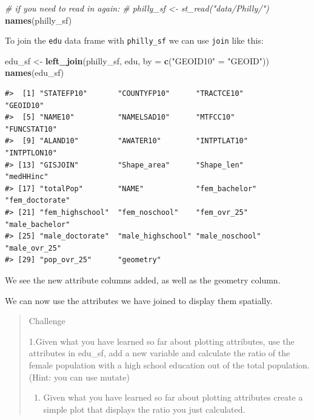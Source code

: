 \documentclass[
]{book}
\newenvironment{Shaded}{\begin{snugshade}}{\end{snugshade}}
\newcommand{\AttributeTok}[1]{\textcolor[rgb]{0.13,0.29,0.53}{#1}}
\newcommand{\CommentTok}[1]{\textcolor[rgb]{0.56,0.35,0.01}{\textit{#1}}}
\newcommand{\FunctionTok}[1]{\textcolor[rgb]{0.13,0.29,0.53}{\textbf{#1}}}
\newcommand{\NormalTok}[1]{#1}
\newcommand{\OtherTok}[1]{\textcolor[rgb]{0.56,0.35,0.01}{#1}}
\newcommand{\StringTok}[1]{\textcolor[rgb]{0.31,0.60,0.02}{#1}}
\providecommand{\tightlist}{%
  \setlength{\itemsep}{0pt}\setlength{\parskip}{0pt}}
\begin{document}
\begin{Shaded}
\begin{Highlighting}[]
\CommentTok{\# if you need to read in again:}
\CommentTok{\# philly\_sf \textless{}{-} st\_read("data/Philly/")}
\FunctionTok{names}\NormalTok{(philly\_sf)}
\end{Highlighting}
\end{Shaded}

To join the \texttt{edu} data frame with \texttt{philly\_sf} we can use \texttt{join} like this:

\begin{Shaded}
\begin{Highlighting}[]
\NormalTok{edu\_sf }\OtherTok{\textless{}{-}} \FunctionTok{left\_join}\NormalTok{(philly\_sf, edu, }\AttributeTok{by =} \FunctionTok{c}\NormalTok{(}\StringTok{"GEOID10"} \OtherTok{=} \StringTok{"GEOID"}\NormalTok{))}
\FunctionTok{names}\NormalTok{(edu\_sf) }
\end{Highlighting}
\end{Shaded}

\begin{verbatim}
#>  [1] "STATEFP10"       "COUNTYFP10"      "TRACTCE10"       "GEOID10"        
#>  [5] "NAME10"          "NAMELSAD10"      "MTFCC10"         "FUNCSTAT10"     
#>  [9] "ALAND10"         "AWATER10"        "INTPTLAT10"      "INTPTLON10"     
#> [13] "GISJOIN"         "Shape_area"      "Shape_len"       "medHHinc"       
#> [17] "totalPop"        "NAME"            "fem_bachelor"    "fem_doctorate"  
#> [21] "fem_highschool"  "fem_noschool"    "fem_ovr_25"      "male_bachelor"  
#> [25] "male_doctorate"  "male_highschool" "male_noschool"   "male_ovr_25"    
#> [29] "pop_ovr_25"      "geometry"
\end{verbatim}

We see the new attribute columns added, as well as the geometry column.

We can now use the attributes we have joined to display them spatially.

\begin{quote}
Challenge

1.Given what you have learned so far about plotting attributes, use the attributes
in edu\_sf, add a new variable and calculate the ratio of the female population with a high school education out of the total population. (Hint: you can use mutate)

\begin{enumerate}
\def\labelenumi{\arabic{enumi}.}
\setcounter{enumi}{1}
\tightlist
\item
  Given what you have learned so far about plotting attributes create a simple
  plot that displays the ratio you just calculated.
\end{enumerate}
\end{quote}
\end{document}
